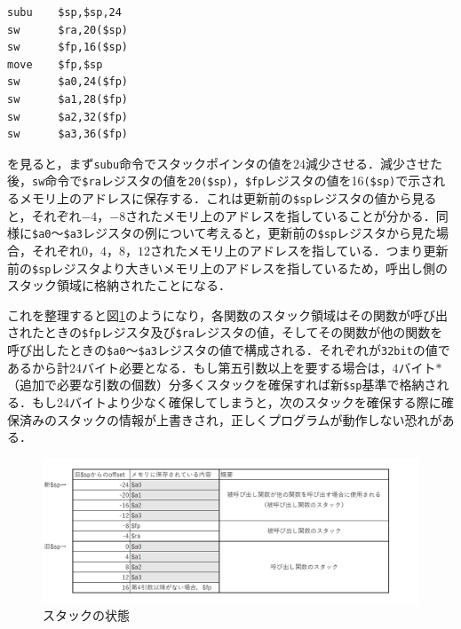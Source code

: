 \begin{Verbatim}[fontsize=\small, baselinestretch=0.8]
subu    $sp,$sp,24
sw      $ra,20($sp)
sw      $fp,16($sp)
move    $fp,$sp
sw      $a0,24($fp)
sw      $a1,28($fp)
sw      $a2,32($fp)
sw      $a3,36($fp)
\end{Verbatim}

を見ると，まず\verb|subu|命令でスタックポインタの値を$24$減少させる．減少させた後，\verb|sw|命令で\verb|$ra|レジスタの値を\verb|20($sp)|，\verb|$fp|レジスタの値を16\verb|($sp)|で示されるメモリ上のアドレスに保存する．これは更新前の\verb|$sp|レジスタの値から見ると，それぞれ$-4$，$-8$されたメモリ上のアドレスを指していることが分かる．同様に\verb|$a0|～\verb|$a3|レジスタの例について考えると，更新前の\verb|$sp|レジスタから見た場合，それぞれ$0$，$4$，$8$，$12$されたメモリ上のアドレスを指している．つまり更新前の\verb|$sp|レジスタより大きいメモリ上のアドレスを指しているため，呼出し側のスタック領域に格納されたことになる．

これを整理すると図\ref{tab:stack}のようになり，各関数のスタック領域はその関数が呼び出されたときの\verb|$fp|レジスタ及び\verb|$ra|レジスタの値，そしてその関数が他の関数を呼び出したときの\verb|$a0|～\verb|$a3|レジスタの値で構成される．それぞれが\verb|32bit|の値であるから計$24$バイト必要となる．もし第五引数以上を要する場合は，$4$バイト$*$（追加で必要な引数の個数）分多くスタックを確保すれば新\verb|$sp|基準で格納される．もし24バイトより少なく確保してしまうと，次のスタックを確保する際に確保済みのスタックの情報が上書きされ，正しくプログラムが動作しない恐れがある．

\begin{figure}[h]
\centering
  \includegraphics[width=16.0cm]{syspro.png}
	\caption{スタックの状態}
	\label{tab:stack}
\end{figure}


